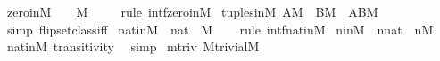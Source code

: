 \begin{isabellebody}
\isanewline
{}\isamarkupfalse%
\ zero{\isacharunderscore}{\kern0pt}in{\isacharunderscore}{\kern0pt}M{\isacharcolon}{\kern0pt}\ \ {\isachardoublequoteopen}{}\ {\isasymin}\ M{\isachardoublequoteclose}\ \isanewline
%
\isadelimproof
\ \ %
\endisadelimproof
%
\isatagproof
{}\isamarkupfalse%
\ {\isacharparenleft}{\kern0pt}rule\ intf{\isachardot}{\kern0pt}zero{\isacharunderscore}{\kern0pt}in{\isacharunderscore}{\kern0pt}M{\isacharparenright}{\kern0pt}%
\endisatagproof
{\isafoldproof}%
%
\isadelimproof
\isanewline
%
\endisadelimproof
\isanewline
{}\isamarkupfalse%
\ tuples{\isacharunderscore}{\kern0pt}in{\isacharunderscore}{\kern0pt}M{\isacharcolon}{\kern0pt}\ {\isachardoublequoteopen}A{\isasymin}M\ {\isasymLongrightarrow}\ B{\isasymin}M\ {\isasymLongrightarrow}\ {\isasymlangle}A{\isacharcomma}{\kern0pt}B{\isasymrangle}{\isasymin}M{\isachardoublequoteclose}\ \isanewline
%
\isadelimproof
\ \ %
\endisadelimproof
%
\isatagproof
{}\isamarkupfalse%
\ {\isacharparenleft}{\kern0pt}simp\ flip{\isacharcolon}{\kern0pt}setclass{\isacharunderscore}{\kern0pt}iff{\isacharparenright}{\kern0pt}%
\endisatagproof
{\isafoldproof}%
%
\isadelimproof
\isanewline
%
\endisadelimproof
\isanewline
{}\isamarkupfalse%
\ nat{\isacharunderscore}{\kern0pt}in{\isacharunderscore}{\kern0pt}M\ {\isacharcolon}{\kern0pt}\ {\isachardoublequoteopen}nat\ {\isasymin}\ M{\isachardoublequoteclose}\isanewline
%
\isadelimproof
\ \ %
\endisadelimproof
%
\isatagproof
{}\isamarkupfalse%
\ {\isacharparenleft}{\kern0pt}rule\ intf{\isachardot}{\kern0pt}nat{\isacharunderscore}{\kern0pt}in{\isacharunderscore}{\kern0pt}M{\isacharparenright}{\kern0pt}%
\endisatagproof
{\isafoldproof}%
%
\isadelimproof
\isanewline
%
\endisadelimproof
\isanewline
{}\isamarkupfalse%
\ n{\isacharunderscore}{\kern0pt}in{\isacharunderscore}{\kern0pt}M\ {\isacharcolon}{\kern0pt}\ {\isachardoublequoteopen}n{\isasymin}nat\ {\isasymLongrightarrow}\ n{\isasymin}M{\isachardoublequoteclose}\isanewline
%
\isadelimproof
\ \ %
\endisadelimproof
%
\isatagproof
{}\isamarkupfalse%
\ nat{\isacharunderscore}{\kern0pt}in{\isacharunderscore}{\kern0pt}M\ transitivity\ \isamarkupfalse%
\ simp%
\endisatagproof
{\isafoldproof}%
%
\isadelimproof
\isanewline
%
\endisadelimproof
\isanewline
{}\isamarkupfalse%
\ mtriv{\isacharcolon}{\kern0pt}\ {\isachardoublequoteopen}M{\isacharunderscore}{\kern0pt}trivial{\isacharparenleft}{\kern0pt}{\isacharhash}{\kern0pt}{\isacharhash}{\kern0pt}M{\isacharparenright}{\kern0pt}{\isachardoublequoteclose}\ \isanewline

\end{isabellebody}
